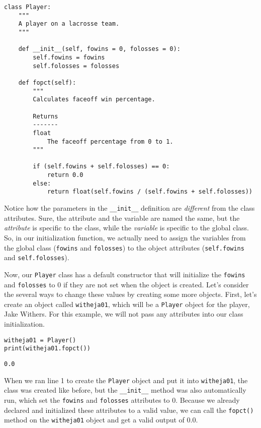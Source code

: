 \begin{lstlisting}[style=pippython]
class Player:
	"""
	A player on a lacrosse team.
	"""
	
	def __init__(self, fowins = 0, folosses = 0):
		self.fowins = fowins
		self.folosses = folosses

	def fopct(self):
		"""
		Calculates faceoff win percentage.
		
		Returns
		-------
		float
			The faceoff percentage from 0 to 1.
		"""
		
		if (self.fowins + self.folosses) == 0:
			return 0.0
		else:
			return float(self.fowins / (self.fowins + self.folosses))
\end{lstlisting}
Notice how the parameters in the \verb|__init__| definition are \textit{different} from the class attributes. Sure, the attribute and the variable are named the same, but the \textit{attribute} is specific to the class, while the \textit{variable} is specific to the global class. So, in our initialization function, we actually need to assign the variables from the global class (\verb|fowins| and \verb|folosses|) to the object attributes (\verb|self.fowins| and \verb|self.folosses|).\par
{}
Now, our \verb|Player| class has a default constructor that will initialize the \verb|fowins| and \verb|folosses| to 0 if they are not set when the object is created. Let's consider the several ways to change these values by creating some more objects. First, let's create an object called \verb|witheja01|, which will be a \verb|Player| object for the player, Jake Withers. For this example, we will not pass any attributes into our class initialization.\par
\begin{lstlisting}[style=pippython]
witheja01 = Player()
print(witheja01.fopct())
\end{lstlisting}
\begin{lstlisting}[style=pippython]
0.0
\end{lstlisting}
When we ran line 1 to create the \verb|Player| object and put it into \verb|witheja01|, the class was created like before, but the \verb|__init__| method was also automatically run, which set the \verb|fowins| and \verb|folosses| attributes to 0. Because we already declared and initialized these attributes to a valid value, we can call the \verb|fopct()| method on the \verb|witheja01| object and get a valid output of 0.0.\par
